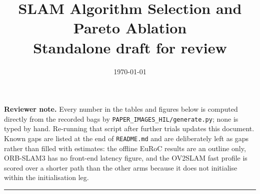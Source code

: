 \documentclass[11pt,a4paper]{article}
\title{\vspace{-1.5cm}SLAM Algorithm Selection and Pareto Ablation\\
       \large Standalone draft for review}
\author{}
\date{\today}
\begin{document}
\maketitle

\noindent
\textbf{Reviewer note.} Every number in the tables and figures below is computed
directly from the recorded bags by \texttt{PAPER\_IMAGES\_HIL/generate.py};
none is typed by hand. Re-running that script after further trials updates this
document. Known gaps are listed at the end of \texttt{README.md} and are
deliberately left as gaps rather than filled with estimates: the offline EuRoC
results are an outline only, ORB-SLAM3 has no front-end latency figure, and the
OV2SLAM fast profile is scored over a shorter path than the other arms because
it does not initialise within the initialisation leg.

\vspace{0.6em}
\hrule
\vspace{1.2em}


\end{document}
